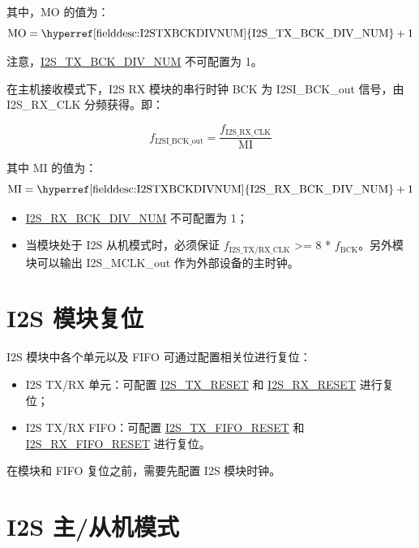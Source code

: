 \documentclass[main\_\_CN.tex]{subfiles}
\begin{document}
其中，MO 的值为：
$$ \textrm{MO} = \textrm{\hyperref[fielddesc:I2STXBCKDIVNUM]{I2S\_TX\_BCK\_DIV\_NUM}} + 1 $$

\vspace{-1em}
\begin{tiplisting}
注意，\hyperref[fielddesc:I2STXBCKDIVNUM]{I2S\_TX\_BCK\_DIV\_NUM} 不可配置为 1。
\end{tiplisting}

在主机接收模式下，I2S RX 模块的串行时钟 BCK 为 I2SI\_BCK\_out 信号，由 I2S\_RX\_CLK 分频获得。即：

$$f_{\textrm{I2SI\_BCK\_out}} = \frac{f_{\textrm{I2S\_RX\_CLK}}}{\textrm{MI}}$$

其中 MI 的值为：
$$ \textrm{MI} = \textrm{\hyperref[fielddesc:I2STXBCKDIVNUM]{I2S\_RX\_BCK\_DIV\_NUM}} + 1 $$

\begin{tiplisting}
\vspace{-2em}
\begin{itemize}
    \item \hyperref[fielddesc:I2SRXBCKDIVNUM]{I2S\_RX\_BCK\_DIV\_NUM} 不可配置为 1；
    \item 当模块处于 I2S 从机模式时，必须保证 $f_{\textrm{I2S\_TX/RX\_CLK}}$ >= 8 * $f_{\textrm{BCK}}$。另外模块可以输出 I2S\_MCLK\_out 作为外部设备的主时钟。
\end{itemize}
\end{tiplisting}

\section{I2S 模块复位} \label{sec:i2s-reset}

I2S 模块中各个单元以及 FIFO 可通过配置相关位进行复位：

\begin{itemize}
\item I2S TX/RX 单元：可配置 \hyperref[fielddesc:I2STXRESET]{I2S\_TX\_RESET} 和 \hyperref[fielddesc:I2SRXRESET]{I2S\_RX\_RESET} 进行复位；
\item I2S TX/RX FIFO：可配置 \hyperref[fielddesc:I2STXFIFORESET]{I2S\_TX\_FIFO\_RESET} 和 \hyperref[fielddesc:I2SRXFIFORESET]{I2S\_RX\_FIFO\_RESET} 进行复位。
\end{itemize}

\begin{tiplisting}
在模块和 FIFO 复位之前，需要先配置 I2S 模块时钟。
\end{tiplisting} 


\section{I2S 主/从机模式}
\end{document}
